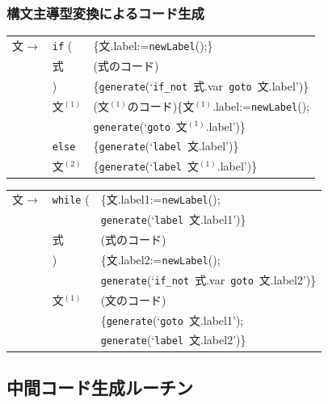 \documentclass[dvipdfmx]{beamer}
\newcommand{\makenewlabel}{{\tt newLabel}()}
\newcommand{\genlabel}[1]{{\tt generate}(`{\tt label}\ {#1}')}
\newcommand{\genifnot}[2]{{\tt generate}(`{\tt if\_not}\ {#1}\ {\tt goto}\ {#2}')}
\newcommand{\gengoto}[1]{{\tt generate}(`{\tt goto}\ {#1}')}
\begin{document}
\begin{frame}
  \frametitle{構文主導型変換によるコード生成}
  {\small
    \begin{tabular}{lll}
      文$\rightarrow$ & {\tt if} (  & \{文.label:=\makenewlabel;\}                                \\
                     & 式           & (式のコード)                                                    \\
                     & )           & \{\genifnot{式.var}{文.label}\}                              \\
                     & 文$^{(1)}$   & (文$^{(1)}$のコード)\{文$^{(1)}$.label:=\makenewlabel;         \\
                     &             & \gengoto{文$^{(1)}$.label}\}                                \\
                     & {\tt else}  & \{\genlabel{文.label}\}                                     \\
                     & 文{$^{(2)}$} & \{\genlabel{文$^{(1)}$.label}\}
    \end{tabular}

    \vspace*{1zw}

    \begin{tabular}{lll}
      文$\rightarrow$ & {\tt while} ( & \{文.label1:=\makenewlabel;   \\
                     &               & \genlabel{文.label1}\}        \\
                     & 式             & (式のコード)                      \\
                     & )             & \{文.label2:=\makenewlabel;   \\
                     &               & \genifnot{式.var}{文.label2}\} \\
                     & 文$^{(1)}$     & (文のコード)                      \\
                     &               & \{\gengoto{文.label1};        \\
                     &               & \genlabel{文.label2}\}        \\
    \end{tabular}
  }
\end{frame}

\subsection{中間コード生成ルーチン}
\end{document}
